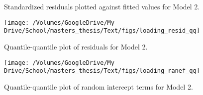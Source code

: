 \documentclass[
  english,
  man]{apa6}
\begin{document}
\begin{appendix}
\begin{figure}
{}

\caption{Standardized residuals plotted against fitted values for Model 2.}\label{fig:residuals-vs-fitted-loading-recovery}
\end{figure}

\begin{figure}

{\centering \texttt{[image: /Volumes/GoogleDrive/My Drive/School/masters\_thesis/Text/figs/loading\_resid\_qq]} 

}

\caption{Quantile-quantile plot of residuals for Model 2.}\label{fig:qq-plot-loading-recovery}
\end{figure}

\begin{figure}

{\centering \texttt{[image: /Volumes/GoogleDrive/My Drive/School/masters\_thesis/Text/figs/loading\_ranef\_qq]} 

}

\caption{Quantile-quantile plot of random intercept terms for Model 2.}\label{fig:qq-plot-randInt-loadings}
\end{figure}
\end{appendix}
\end{document}
